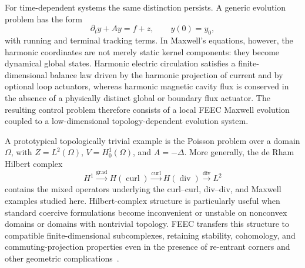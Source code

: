 \documentclass{article}
\DeclareMathOperator{\grad}{grad}
\DeclareMathOperator{\curl}{curl}
\DeclareMathOperator{\divergence}{div}
\begin{document}
For time-dependent systems the same distinction persists.  A generic evolution problem has the form
\begin{equation}
    \partial_t y+Ay=f+z,\qquad y(0)=y_0,
\end{equation}
with running and terminal tracking terms.  In Maxwell's equations, however, the harmonic coordinates are not merely static kernel components: they become dynamical global states.  Harmonic electric circulation satisfies a finite-dimensional balance law driven by the harmonic projection of current and by optional loop actuators, whereas harmonic magnetic cavity flux is conserved in the absence of a physically distinct global or boundary flux actuator.  The resulting control problem therefore consists of a local FEEC Maxwell evolution coupled to a low-dimensional topology-dependent evolution system.

A prototypical topologically trivial example is the Poisson problem over a domain $\Omega$, with $Z=L^2(\Omega)$, $V=H^1_0(\Omega)$, and $A=-\Delta$.  More generally, the de Rham Hilbert complex
\[
    H^1\xrightarrow{\grad}H(\curl)\xrightarrow{\curl}H(\divergence)\xrightarrow{\divergence}L^2
\]
contains the mixed operators underlying the curl--curl, div--div, and Maxwell examples studied here.  Hilbert-complex structure is particularly useful when standard coercive formulations become inconvenient or unstable on nonconvex domains or domains with nontrivial topology.  FEEC transfers this structure to compatible finite-dimensional subcomplexes, retaining stability, cohomology, and commuting-projection properties even in the presence of re-entrant corners and other geometric complications~\cite{arnold2010finite,schwedes2017mesh}.
\end{document}
